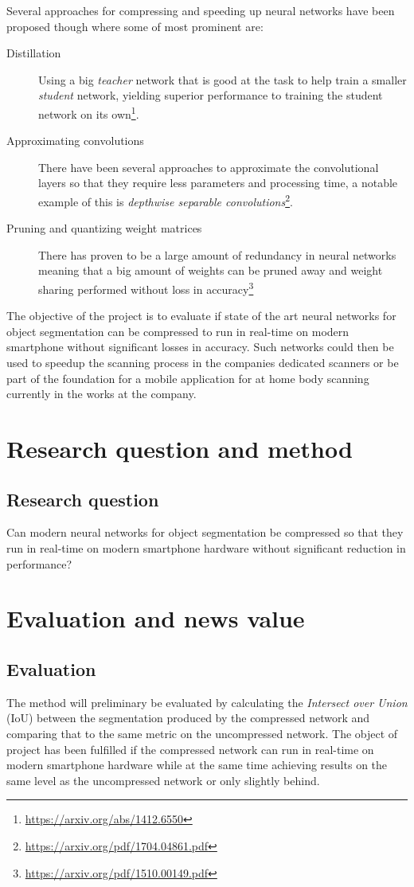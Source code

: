 \documentclass[11pt]{article}
\begin{document}
Several approaches for compressing and speeding up neural networks have been proposed though where some of most prominent are: 
\begin{description}
\item[{Distillation}] Using a big \emph{teacher} network that is good at the task to help train a smaller \emph{student} network, yielding superior performance to training the student network on its own\footnote{\url{https://arxiv.org/abs/1412.6550}\label{org07d7f6b}}.
\item[{Approximating convolutions}] There have been several approaches to approximate the convolutional layers so that they require less parameters and processing time, a notable example of this is \emph{depthwise separable convolutions}\footnote{\url{https://arxiv.org/pdf/1704.04861.pdf}\label{org6f50c41}}.
\item[{Pruning and quantizing weight matrices}] There has proven to be a large amount of redundancy in neural networks meaning that a big amount of weights can be pruned away and weight sharing performed without loss in accuracy\footnote{\url{https://arxiv.org/pdf/1510.00149.pdf}\label{org306cf5e}}
\end{description}

The objective of the project is to evaluate if state of the art neural networks for object segmentation can be compressed to run in real-time on modern smartphone without significant losses in accuracy. Such networks could then be used to speedup the scanning process in the companies dedicated scanners or be part of the foundation for a mobile application for at home body scanning currently in the works at the company.


\section{Research question and method}
\label{sec:orgd6c4238}
\subsection{Research question}
\label{sec:org6bd8a0c}
Can modern neural networks for object segmentation be compressed so that they run in real-time on modern smartphone hardware without significant reduction in performance?
\section{Evaluation and news value}
\label{sec:org2f519ba}
\subsection{Evaluation}
\label{sec:org163472d}
The method will preliminary be evaluated by calculating the \emph{Intersect over Union} (IoU) between the segmentation produced by the compressed network and comparing that to the same metric on the uncompressed network. The object of project has been fulfilled if the compressed network can run in real-time on modern smartphone hardware while at the same time achieving results on the same level as the uncompressed network or only slightly behind.
\end{document}
